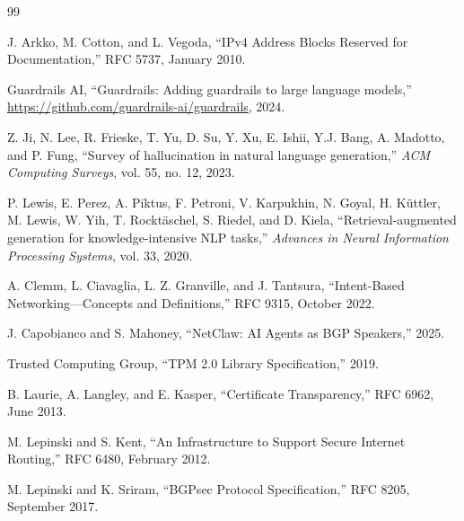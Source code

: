 \documentclass[11pt,twocolumn]{article}
\begin{document}
\begin{thebibliography}{99}

J. Arkko, M. Cotton, and L. Vegoda,
``IPv4 Address Blocks Reserved for Documentation,''
RFC 5737, January 2010.

Guardrails AI,
``Guardrails: Adding guardrails to large language models,''
\url{https://github.com/guardrails-ai/guardrails}, 2024.

Z. Ji, N. Lee, R. Frieske, T. Yu, D. Su, Y. Xu, E. Ishii, Y.J. Bang, A. Madotto, and P. Fung,
``Survey of hallucination in natural language generation,''
\textit{ACM Computing Surveys}, vol. 55, no. 12, 2023.

P. Lewis, E. Perez, A. Piktus, F. Petroni, V. Karpukhin, N. Goyal, H. K\"{u}ttler, M. Lewis, W. Yih, T. Rockt\"{a}schel, S. Riedel, and D. Kiela,
``Retrieval-augmented generation for knowledge-intensive NLP tasks,''
\textit{Advances in Neural Information Processing Systems}, vol. 33, 2020.

A. Clemm, L. Ciavaglia, L. Z. Granville, and J. Tantsura,
``Intent-Based Networking---Concepts and Definitions,''
RFC 9315, October 2022.

J. Capobianco and S. Mahoney,
``NetClaw: AI Agents as BGP Speakers,''
2025.

Trusted Computing Group,
``TPM 2.0 Library Specification,''
2019.

B. Laurie, A. Langley, and E. Kasper,
``Certificate Transparency,''
RFC 6962, June 2013.

M. Lepinski and S. Kent,
``An Infrastructure to Support Secure Internet Routing,''
RFC 6480, February 2012.

M. Lepinski and K. Sriram,
``BGPsec Protocol Specification,''
RFC 8205, September 2017.

\end{thebibliography}
\end{document}
